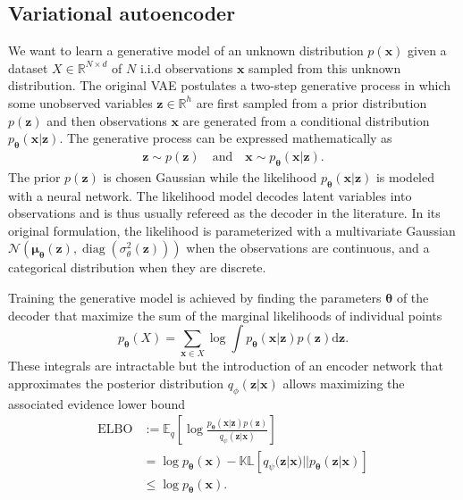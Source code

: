 \documentclass{article}
\newcommand{\diag}{\operatorname{diag}}
\begin{document}
\subsection{Variational autoencoder}
We want to learn a generative model of an unknown distribution $p(\mathbf{x})$ given a dataset $X \in \mathbb{R}^{N\times d}$ of $N$ i.i.d observations $\mathbf{x}$ sampled from this unknown distribution. 
The original VAE postulates a two-step generative process in which some unobserved variables $\mathbf{z} \in \mathbb{R}^h$ are first sampled from a prior distribution $p(\mathbf{z})$ and then observations $\mathbf{x}$ are generated from a conditional distribution $p_\mathbf{\theta}(\mathbf{x}|\mathbf{z})$. The generative process can be expressed mathematically as
\begin{align}
     \mathbf{z} \sim p(\mathbf{z}) \quad \text{and} \quad \mathbf{x} \sim p_\mathbf{\theta}(\mathbf{x}|\mathbf{z}).
\end{align}
The prior $p(\mathbf{z})$ is chosen Gaussian while the likelihood $p_\mathbf{\theta}(\mathbf{x}|\mathbf{z})$ is modeled with a neural network. The likelihood model decodes latent variables into observations and is thus usually refereed as the decoder in the literature. In its original formulation, the likelihood is parameterized with a multivariate Gaussian $\mathcal{N}(\mathbf{\mu_\theta}(\mathbf{z}), \diag(\sigma_\theta^2(\mathbf{z})))$ when the observations are continuous, and a categorical distribution when they are discrete.

Training the generative model is achieved by finding the parameters $\mathbf{\theta}$ of the decoder that maximize the sum of the marginal likelihoods of individual points $$p_\mathbf{\theta}(X)= \sum_{\mathbf{x}\in X}\log \int p_\mathbf{\theta}(\mathbf{x}|\mathbf{z}) p(\mathbf{z}) \text{d}\mathbf{z}.$$ 
These integrals are intractable but the introduction of an encoder network that approximates the posterior distribution $q_\phi(\mathbf{z}|\mathbf{x})$ allows maximizing the associated evidence lower bound
\begin{align}
    \operatorname{ELBO}&:=\mathbb{E}_q\left[\log \frac{p_\mathbf{\theta} (\mathbf{x}|\mathbf{z}) p(\mathbf{z})}{q_\psi(\mathbf{z}|\mathbf{x})} \right]\label{eq:ELBO_VAE}\\
    &=\log p_\mathbf{\theta}(\mathbf{x}) - \mathbb{KL}\left[q_\psi(\mathbf{z}|\mathbf{x})||p_\mathbf{\theta} (\mathbf{z}|\mathbf{x})\right]\\
    &\leq \log p_\mathbf{\theta}(\mathbf{x}).
\end{align}
\end{document}
